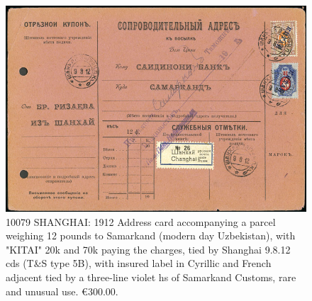 \begin{figure}[htbp]
\centering
\includegraphics[width=.95\textwidth]{../russian-post-offices-in-china/10079.jpg}
\caption{
10079 SHANGHAI: 1912 Address card accompanying a parcel weighing 12 pounds 
to Samarkand (modern day Uzbekistan), with "KITAI" 20k and 70k paying the 
charges, tied by Shanghai 9.8.12 cds (T\&S type 5B), with insured label in 
Cyrillic and French adjacent tied by a three-line violet hs of Samarkand 
Customs, rare and unusual use.
\euro 300.00. 
}  
\end{figure}


          